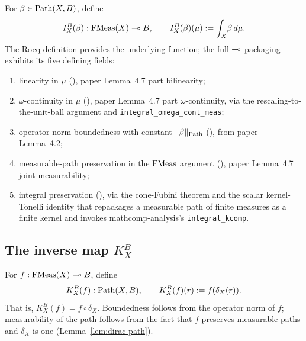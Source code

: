 \begin{definition}%
\label{def:int-to-linhom}\rocqok\mathcompok
{}%
For $\beta \in \mathrm{Path}(X, B)$, define
\[
  I^B_X(\beta) : \mathrm{FMeas}(X) \multimap B,
  \qquad I^B_X(\beta)(\mu) := \int_{X}\!\beta\,d\mu.
\]
The Rocq definition 
provides the underlying function; the full $\multimap$ packaging
exhibits its five defining fields:
\begin{enumerate}
  \item linearity in $\mu$
    (), paper
    Lemma~4.7 part bilinearity;
  \item $\omega$-continuity in $\mu$
    (), paper
    Lemma~4.7 part $\omega$-continuity, via the
    rescaling-to-the-unit-ball argument and
    \texttt{integral\_omega\_cont\_meas};
  \item operator-norm boundedness with constant $\lVert \beta \rVert_{\mathrm{Path}}$
    (), from paper
    Lemma~4.2;
  \item measurable-path preservation in the $\mathrm{FMeas}$ argument
    (), paper
    Lemma~4.7 joint measurability;
  \item integral preservation
    (), via the
    cone-Fubini theorem and the scalar kernel-Tonelli identity
     that
    repackages a measurable path of finite measures as a finite
    kernel and invokes mathcomp-analysis's \texttt{integral\_kcomp}.
\end{enumerate}
\end{definition}

\subsection{The inverse map \texorpdfstring{$K^B_X$}{K^B_X}}\label{sec:linhom-to-int}

\begin{definition}%
\label{def:linhom-to-int}\rocqok\mathcompok
{}%
For $f : \mathrm{FMeas}(X) \multimap B$, define
\[
  K^B_X(f) : \mathrm{Path}(X, B), \qquad
  K^B_X(f)(r) := f(\delta_X(r)).
\]
That is, $K^B_X(f) = f \circ \delta_X$. Boundedness follows from the
operator norm of $f$; measurability of the path follows from the
fact that $f$ preserves measurable paths and $\delta_X$ is one
(Lemma~\ref{lem:dirac-path}).
\end{definition}

